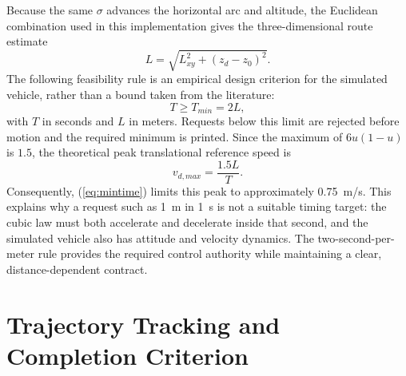 \documentclass[conference]{IEEEtran}
\begin{document}
Because the same $\sigma$ advances the horizontal arc and altitude, the
Euclidean combination used in this implementation gives the three-dimensional
route estimate
\begin{equation}
 L=\sqrt{L_{xy}^{2}+(z_d-z_0)^2}.
 \label{eq:spatiallength}
\end{equation}
The following feasibility rule is an empirical design criterion for the
simulated vehicle, rather than a bound taken from the literature:
\begin{equation}
 T\geq T_{min}=2L,
 \label{eq:mintime}
\end{equation}
with $T$ in seconds and $L$ in meters. Requests below this limit are rejected
before motion and the required minimum is printed. Since the maximum of
$6u(1-u)$ is $1.5$, the theoretical peak translational reference speed is
\begin{equation}
 v_{d,max}=\frac{1.5L}{T}.
 \label{eq:peakvelocity}
\end{equation}
Consequently, (\ref{eq:mintime}) limits this peak to approximately 0.75~m/s.
This explains why a request such as 1~m in 1~s is not a suitable timing target:
the cubic law must both accelerate and decelerate inside that second, and the
simulated vehicle also has attitude and velocity dynamics. The two-second-per-
meter rule provides the required control authority while maintaining a clear,
distance-dependent contract.

\section{Trajectory Tracking and Completion Criterion}
\end{document}
